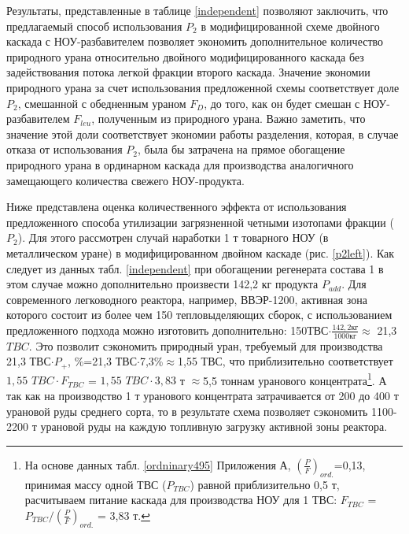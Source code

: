 Результаты, представленные в таблице \ref{independent} позволяют заключить, что предлагаемый способ использования $P_2$ в модифицированной схеме двойного каскада с НОУ-разбавителем позволяет экономить дополнительное количество природного урана относительно двойного модифицированного каскада без задействования потока легкой фракции второго каскада. Значение экономии природного урана за счет использования предложенной схемы соответствует доле $P_2$, смешанной с обедненным ураном $F_D$, до того, как он будет смешан с НОУ-разбавителем $F_{leu}$, полученным из природного урана. Важно заметить, что значение этой доли соответствует экономии работы разделения, которая, в случае отказа от использования $P_2$, была бы затрачена на прямое обогащение природного урана в ординарном каскада для производства аналогичного замещающего количества свежего НОУ-продукта.

Ниже представлена оценка количественного эффекта от использования предложенного способа утилизации загрязненной четными изотопами фракции ($P_2$). Для этого рассмотрен случай наработки 1 т товарного НОУ (в металлическом уране) в модифицированном двойном каскаде (рис. \ref{p2left}). Как следует из данных табл. \ref{independent} при обогащении регенерата состава 1 в этом случае можно дополнительно произвести 142,2 кг продукта $P_{add}$. Для современного легководного реактора, например, ВВЭР-1200, активная зона которого состоит из более чем 150 тепловыделяющих сборок, с использованием предложенного подхода можно изготовить дополнительно: 150$ $ТВС$\cdot \frac{142,2 \textit{кг}}{1000 \textit{кг}}\approx$ 21,3 $TBC$. Это позволит сэкономить природный уран, требуемый для производства 21,3 ТВС$\cdot P_{+}$, \%=21,3 ТВС$\cdot$7,3\%$\approx$1,55 ТВС, что приблизительно соответствует $1,55$  $TBC \cdot F_{TBC}$ = $1,55$ $TBC\cdot 3,83$ т $\approx$5,5 тоннам уранового концентрата\footnote{На основе данных табл. \ref{ordninary495} Приложения А, $(\frac{P}{F})_{ord.}$=0,13,  принимая массу одной ТВС ($P_{TBC}$) равной приблизительно 0,5 т, расчитываем питание каскада для производства НОУ для 1 ТВС: $F_{TBC}$ = $P_{TBC}/(\frac{P}{F})_{ord.}$ = 3,83 т.}. А так как на производство 1 т уранового концентрата затрачивается от 200 до 400 т урановой руды \cite{bekmanYaDERNAYaFIZIKA} среднего сорта, то в результате схема позволяет сэкономить 1100-2200 т урановой руды на каждую топливную загрузку активной зоны реактора.


